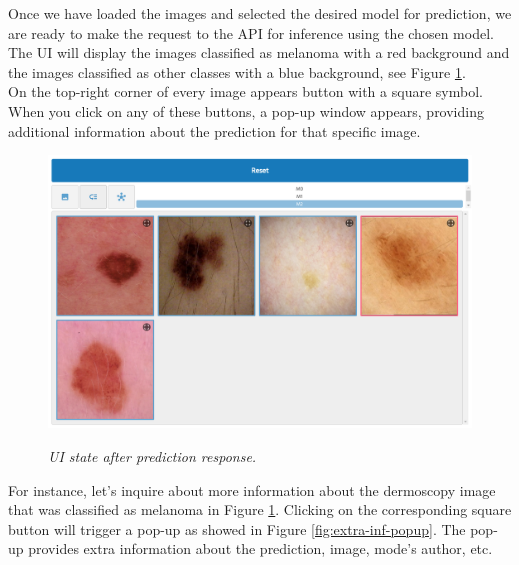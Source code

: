 Once we have loaded the images and selected the desired model for prediction,
we are ready to make the request to the API for inference using the chosen
model. The UI will display the images classified as melanoma with a red
background and the images classified as other classes with a blue background,
see Figure \ref{fig:after-prediction}. \\

On the top-right corner of every image appears button with a
square symbol. When you click on any of these buttons, a pop-up window appears,
providing additional information about the prediction for that specific image. \\

\begin{figure}[H]
  \centering
  \begin{adjustbox}{width=0.9\textwidth, trim={0cm 3.55cm 0cm 0cm}, clip}
    \includegraphics[width=\textwidth]{imatges/results/after-prediction.png}
  \end{adjustbox}
  \caption[UI state after prediction response]{\textit{UI state after prediction response.}}
  {\label{fig:after-prediction}}
\end{figure}


For instance, let's inquire about more information about the dermoscopy image
that was classified as melanoma in Figure \ref{fig:after-prediction}. Clicking
on the corresponding square button will trigger a pop-up as showed in Figure
\ref{fig:extra-inf-popup}. The pop-up provides extra information about the
prediction, image, mode's author, etc.

